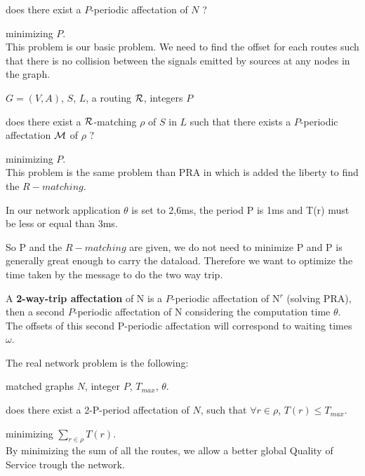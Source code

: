 \documentclass{article}
\begin{document}
 does there exist a $P$-periodic affectation of $N$ ?

 minimizing $P$.\\

This problem is our basic problem. We need to find the offset for each routes such that there is no collision between the signals emitted by sources at any nodes in the graph.\\


 $G=(V,A)$, $S$, $L$,  a routing $\cal R$, integers $P$

 does there exist  a ${\cal R}$-matching $\rho$ of $S$ in $L$ such that there exists a $P$-periodic affectation $\cal M$ of $\rho$ ?

 minimizing $P$.\\

This problem is the same problem than PRA in which is added the liberty to find the $R-matching$.

In our network application $\theta$ is set to 2,6ms, the period P is 1ms and T(r) must be less or equal than 3ms.

So P and the $R-matching$ are given, we do not need to minimize P and P is generally great enough to carry the dataload.
Therefore we want to optimize the time taken by the message to do the two way trip.

A {\bf 2-way-trip affectation} of N is a $P$-periodic affectation of N$^r$ (solving PRA), then a second $P$-periodic affectation of N considering the computation time $\theta$. 
The offsets of this second P-periodic affectation will correspond to waiting times $\omega$.

The real network problem is the following:\\


 matched graphs $N$, integer $P$, $ T_{max}$, $\theta$.

 does there exist a 2-P-period affectation of $N$, such that $\forall r \in \rho$, $T(r) \le T_{max}$.

 minimizing $\sum_{r \in \rho}  T(r)$.\\

By minimizing the sum of all the routes, we allow a better global Quality of Service trough the network.
\end{document}
